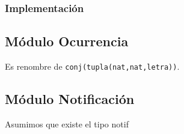 \subsubsection{Implementación}

\subsection{Módulo Ocurrencia}
Es renombre de \texttt{conj(tupla(nat,nat,letra))}.

\subsection{Módulo Notificación}
Asumimos que existe el tipo notif

